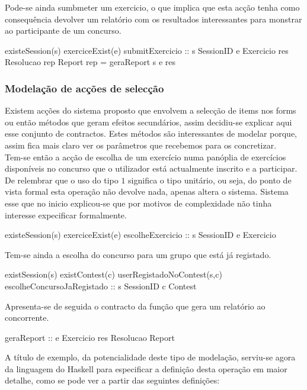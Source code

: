 Pode-se ainda sumbmeter um exercicio, o que implica que esta acção tenha como consequência devolver um relatório com os resultados interessantes para monstrar
ao participante de um concurso.

\prop
{ existeSession(s) \wedge exerciceExist(e) }
{ submitExercicio :: s \unif SessionID \rarrow e \unif Exercicio \rarrow res \unif Resolucao \rarrow rep \unif Report}
{ rep = geraReport s e res }

\subsubsection{Modelação de acções de selecção}
Existem acções do sistema proposto que envolvem a selecção de items nos forms ou então métodos que geram efeitos secundários, assim decidiu-se explicar aqui esse conjunto de
contractos. Estes métodos são interessantes de modelar porque, assim fica mais claro ver os parâmetros que recebemos para os concretizar.\\

Tem-se então a acção de escolha de um exercício numa panóplia de exercícios disponíveis no concurso que o utilizador está actualmente inscrito e a participar.\\
De relembrar que o uso do tipo $1$ significa o tipo unitário, ou seja, do ponto de vista formal esta operação não devolve nada, apenas altera o sistema.
Sistema esse que no inicio explicou-se que por motivos de complexidade não tinha interesse expecificar formalmente.

\prop
{ existeSession(s) \wedge exerciceExist(e) }
{escolheExercicio :: s \unif SessionID \rarrow e \unif Exercicio }
{ }

Tem-se ainda a escolha do concurso para um grupo que está já registado.

\prop
{ existSession(s) \wedge existContest(c) \wedge userRegistadoNoContest(s,c) }
{escolheConcursoJaRegistado :: s \unif SessionID \rarrow c \unif Contest }
{ }

Apresenta-se de seguida o contracto da função que gera um relatório ao concorrente.

\prop
{ }
{geraReport :: e \unif Exercicio \rarrow res \unif Resolucao \rarrow Report}
{ }

A título de exemplo, da potencialidade deste tipo de modelação, serviu-se agora da linguagem do Haskell para especificar a definição desta operação em maior detalhe, como se pode ver a partir das seguintes definições:

